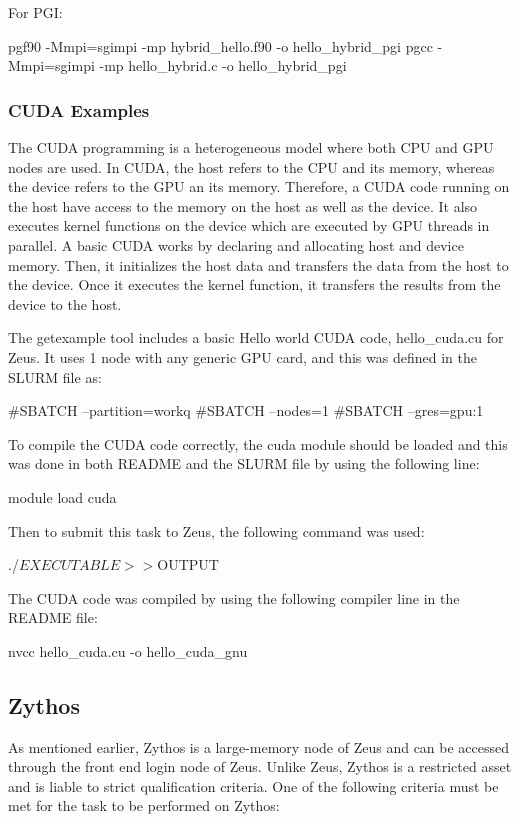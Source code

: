 \documentclass[journal]{IEEEtran}
\begin{document}
For PGI:

pgf90 -Mmpi=sgimpi -mp hybrid_hello.f90 -o hello_hybrid_pgi
pgcc -Mmpi=sgimpi -mp hello_hybrid.c -o hello_hybrid_pgi

\subsubsection{CUDA Examples}

The CUDA programming is a heterogeneous model where both CPU and GPU nodes are used. In CUDA, the host refers to the CPU and its memory, whereas the 
device refers to the GPU an its memory. Therefore, a CUDA code running on the host have access to the memory on the host as well as the device. It also 
executes kernel functions on the device which are executed by GPU threads in parallel. A basic CUDA works by declaring and allocating host and device 
memory. Then, it initializes the host data and transfers the data from the host to the device. Once it executes the kernel function, it transfers the 
results from the device to the host.

The getexample tool includes a basic Hello world CUDA code, hello_cuda.cu for Zeus. It uses 1 node with any generic GPU card, and this was defined in the 
SLURM file as:

#SBATCH --partition=workq
#SBATCH --nodes=1
#SBATCH --gres=gpu:1

To compile the CUDA code correctly, the cuda module should be loaded and this was done in both README and the SLURM file by using the following line:

module load cuda

Then to submit this task to Zeus, the following command was used:

./$EXECUTABLE >> ${OUTPUT}

The CUDA code was compiled by using the following compiler line in the README file:

nvcc hello_cuda.cu -o hello_cuda_gnu
 
  
\subsection{Zythos}

As mentioned earlier, Zythos is a large-memory node of Zeus and can be accessed through the front end login node of Zeus. Unlike Zeus, Zythos is a 
restricted asset and is liable to strict qualification criteria. One of the following criteria must be met for the task to be performed on Zythos:
\end{document}
